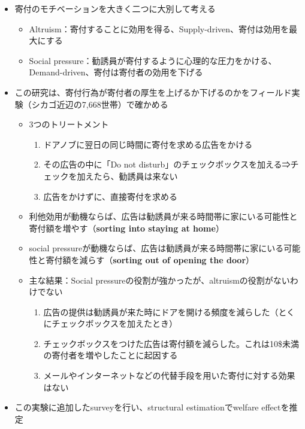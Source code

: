 \documentclass[../root]{subfiles}
\begin{document}
    \begin{itemize}
        \item 寄付のモチベーションを大きく二つに大別して考える
        \begin{itemize}
            \item Altruism：寄付することに効用を得る、Supply-driven、寄付は効用を最大にする
            \item Social pressure：勧誘員が寄付するように心理的な圧力をかける、Demand-driven、寄付は寄付者の効用を下げる
        \end{itemize}
        \item この研究は、寄付行為が寄付者の厚生を上げるか下げるのかをフィールド実験（シカゴ近辺の7,668世帯）で確かめる
        \begin{itemize}
            \item 3つのトリートメント
            \begin{enumerate}
                \item ドアノブに翌日の同じ時間に寄付を求める広告をかける
                \item その広告の中に「Do not disturb」のチェックボックスを加える⇒チェックを加えたら、勧誘員は来ない
                \item 広告をかけずに、直接寄付を求める
            \end{enumerate}
            \item 利他効用が動機ならば、広告は勧誘員が来る時間帯に家にいる可能性と寄付額を増やす（\textbf{sorting into staying at home}）
            \item social pressureが動機ならば、広告は勧誘員が来る時間帯に家にいる可能性と寄付額を減らす（\textbf{sorting out of opening the door}）
            \item 主な結果：Social pressureの役割が強かったが、altruismの役割がないわけでない
            \begin{enumerate}
                \item 広告の提供は勧誘員が来た時にドアを開ける頻度を減らした（とくにチェックボックスを加えたとき）
                \item チェックボックスをつけた広告は寄付額を減らした。これは10\$未満の寄付者を増やしたことに起因する
                \item メールやインターネットなどの代替手段を用いた寄付に対する効果はない
            \end{enumerate}
        \end{itemize}
        \item この実験に追加したsurveyを行い、structural estimationでwelfare effectを推定

\end{itemize}
\end{document}
